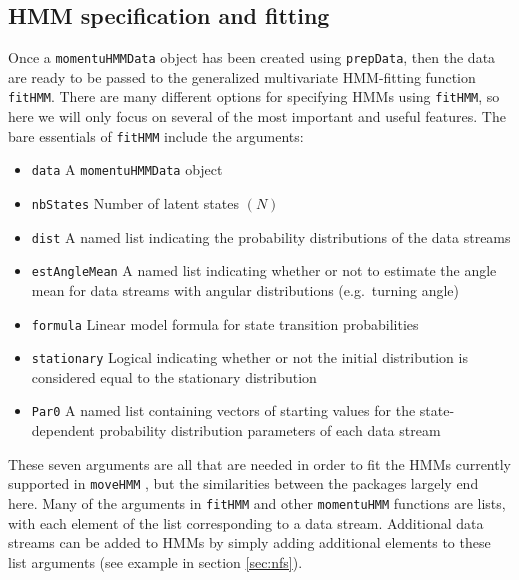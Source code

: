 \documentclass[12pt]{article}\usepackage[]{graphicx}\usepackage[]{color}
\begin{document}
\subsection{HMM specification and fitting}
Once a \verb|momentuHMMData| object has been created using \verb|prepData|, then the data are ready to be passed to the generalized multivariate HMM-fitting function \verb|fitHMM|. There are many different options for specifying HMMs using \verb|fitHMM|, so here we will only focus on several of the most important and useful features. The bare essentials of \verb|fitHMM| include the arguments:
\begin{itemize}
  \item{\verb|data|} A \verb|momentuHMMData| object
  \item{\verb|nbStates|} Number of latent states $(N)$
  \item{\verb|dist|} A named list indicating the probability distributions of the data streams
  \item{\verb|estAngleMean|} A named list indicating whether or not to estimate the angle mean for data streams with angular distributions (e.g.\ turning angle)
  \item{\verb|formula|} Linear model formula for state transition probabilities
  \item{\verb|stationary|} Logical indicating whether or not the initial distribution is considered equal to the stationary distribution
  \item{\verb|Par0|} A named list containing vectors of starting values for the state-dependent probability distribution parameters of each data stream
\end{itemize}
These seven arguments are all that are needed in order to fit the HMMs currently supported in \verb|moveHMM| \citep{MichelotEtAl2016}, but the similarities between the packages largely end here. Many of the arguments in \verb|fitHMM| and other \verb|momentuHMM| functions are lists, with each element of the list corresponding to a data stream. %
Additional data streams can be added to HMMs by simply adding additional elements to these list arguments (see example in section \ref{sec:nfs}).  
\end{document}
